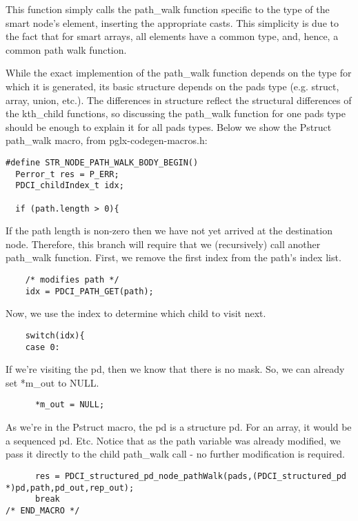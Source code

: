 \documentclass{article}
\begin{document}
This function simply calls the path_walk function specific to the type 
of the smart node's element, inserting the appropriate casts. This 
simplicity is due to the fact that for smart arrays, all elements have a 
common type, and, hence, a common path walk function.

  While the exact implemention of the path_walk function depends on the 
type for which it is generated, its basic structure depends on the pads 
type (e.g. struct, array, union, etc.). The differences in structure 
reflect the structural differences of the kth_child functions, so 
discussing the path_walk function for one pads type should be enough to 
explain it for all pads types. Below we show the Pstruct path_walk 
macro, from pglx-codegen-macros.h:

\begin{verbatim}
#define STR_NODE_PATH_WALK_BODY_BEGIN()
  Perror_t res = P_ERR;
  PDCI_childIndex_t idx;
 
  if (path.length > 0){
\end{verbatim}

If the path length is non-zero then we have not yet arrived at the 
destination node.  Therefore, this branch will require that we 
(recursively) call another path_walk function.
First, we remove the first index from the path's index list.

\begin{verbatim}
    /* modifies path */
    idx = PDCI_PATH_GET(path);
\end{verbatim}

Now, we use the index to determine which child to visit next.

\begin{verbatim}
    switch(idx){
    case 0:
\end{verbatim}

If we're visiting the pd, then we know that there is no mask. So, we can 
already set *m_out to NULL.

\begin{verbatim}
      *m_out = NULL;
\end{verbatim}

As we're in the Pstruct macro, the pd is a structure pd. For an array, 
it would be a sequenced pd. Etc. Notice that as the path variable was 
already modified, we pass it directly to the child path_walk call - no 
further modification is required.

\begin{verbatim}
      res = PDCI_structured_pd_node_pathWalk(pads,(PDCI_structured_pd 
*)pd,path,pd_out,rep_out);
      break
/* END_MACRO */
\end{verbatim}
\end{document}
